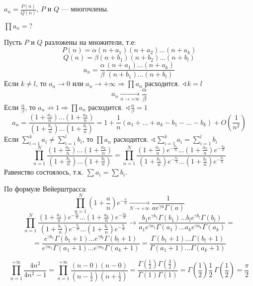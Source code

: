 \begin{example}
    $a_n=\frac{P(n)}{Q(n)}$, $P$ и $Q$ --- многочлены.

    $\prod a_n=?$

    Пусть $P$ и $Q$ разложены на множители, т.е:
    $$P(n)=\alpha(n+a_1)(n+a_2)\ldots(n+a_k)$$
    $$Q(n)=\beta(n+b_1)(n+b_2)\ldots(n+b_l)$$
    $$a_n=\frac{\alpha}{\beta}\frac{(n+a_1)\ldots(n+a_k)}{(n+b_1)\ldots(n+b_l)}$$
    Если $k\not=l$, то $a_n\to0$ или $a_n\to+\infty \Rightarrow \prod a_n$ расходится.
    $\sphericalangle k=l$
    $$a_n\xrightarrow[n\to+\infty]{}\frac{\alpha}{\beta}$$
    Если $\frac{\alpha}{\beta}$, то $a_n\not\to1 \Rightarrow \prod a_n$ расходится.
    $\sphericalangle \frac{\alpha}{\beta}=1$
    $$a_n=\frac{\left(1+\frac{a_1}{n}\right)\ldots \left(1+\frac{a_k}{n}\right)}{\left(1+\frac{b_1}{n}\right)\ldots \left(1+\frac{b_l}{n}\right)}=1+\frac{1}{n}(a_1+\ldots+a_k-b_1-\ldots-b_k)+O(\frac{1}{n^2})$$
    Если $\sum\limits_{i=1}^k a_i\not=\sum\limits_{i=1}^l b_i$, то $\prod a_n$ расходится. $\sphericalangle \sum\limits_{i=1}^k a_i=\sum\limits_{i=1}^l b_i$
    $$\prod_{n=1}^N \frac{\left(1+\frac{a_1}{n}\right)\ldots \left(1+\frac{a_k}{n}\right)}{\left(1+\frac{b_1}{n}\right)\ldots \left(1+\frac{b_l}{n}\right)}=\prod_{n=1}^N \frac{\left(1+\frac{a_1}{n}\right)e^{-\frac{a_1}{n}}\ldots \left(1+\frac{a_k}{n}\right)e^{-\frac{a_k}{n}}}{\left(1+\frac{b_1}{n}\right)e^{-\frac{b_1}{n}}\ldots \left(1+\frac{b_l}{n}\right)e^{-\frac{b_l}{n}}}$$
    Равенство состоялось, т.к. $\sum a_i=\sum b_i$.

    По формуле Вейерштрасса:
    $$\prod_{n=1}^N \left(1+\frac{a}{n}\right)e^{-\frac{a}{n}}\xrightarrow[N\to+\infty]{}\frac{1}{ae^{\gamma a}\Gamma(a)}$$
    $$\prod_{n=1}^N \frac{\left(1+\frac{a_1}{n}\right)e^{-\frac{a_1}{n}}\ldots \left(1+\frac{a_k}{n}\right)e^{-\frac{a_k}{n}}}{\left(1+\frac{b_1}{n}\right)e^{-\frac{b_1}{n}}\ldots \left(1+\frac{b_l}{n}\right)e^{-\frac{b_l}{n}}}\xrightarrow[]{}\frac{b_1e^{\gamma b_1}\Gamma(b_1)\ldots b_le^{\gamma b_l}\Gamma(b_l)}{a_1e^{\gamma a_1}\Gamma(a_1)\ldots a_ke^{\gamma a_k}\Gamma(a_k)}=$$
    $$=\frac{e^{\gamma b_1}\Gamma(b_1+1)\ldots e^{\gamma b_l}\Gamma(b_l+1)}{e^{\gamma a_1}\Gamma(a_1+1)\ldots e^{\gamma a_k}\Gamma(a_k+1)}=\frac{\Gamma(b_1+1)\ldots \Gamma(b_l+1)}{\Gamma(a_1+1)\ldots \Gamma(a_k+1)}$$
\end{example}

$$\prod_{n=1}^{+\infty}\frac{4n^2}{4n^2-1}=\prod_{n=1}^{+\infty}\frac{(n-0)(n-0)}{\left(n-\frac{1}{2}\right)\left(n+\frac{1}{2}\right)}=\frac{\Gamma\left(\frac{1}{2}\right)\Gamma\left(\frac{3}{2}\right)}{\Gamma(1)\Gamma(1)}=\Gamma\left(\frac{1}{2}\right)\frac{1}{2}\,\Gamma\left(\frac{1}{2}\right)=\frac{\pi}{2}$$

